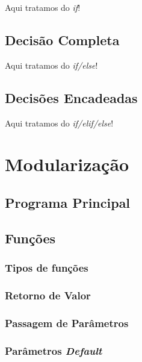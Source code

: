 \documentclass[
]{book}
\begin{document}
Aqui tratamos do \emph{if}!

\hypertarget{decis-if-else}{%
\section{Decisão Completa}\label{decis-if-else}}

Aqui tratamos do \emph{if/else}!

\hypertarget{decis-if-elif-else}{%
\section{Decisões Encadeadas}\label{decis-if-elif-else}}

Aqui tratamos do \emph{if/elif/else}!

\hypertarget{modul}{%
\chapter{Modularização}\label{modul}}

\hypertarget{modul-main}{%
\section{Programa Principal}\label{modul-main}}

\hypertarget{modul-funcao}{%
\section{Funções}\label{modul-funcao}}

\hypertarget{modul-funcao-tipos}{%
\subsection{Tipos de funções}\label{modul-funcao-tipos}}

\hypertarget{modul-funcao-return}{%
\subsection{Retorno de Valor}\label{modul-funcao-return}}

\hypertarget{modul-funcao-param}{%
\subsection{Passagem de Parâmetros}\label{modul-funcao-param}}

\hypertarget{modul-funcao-default}{%
\subsection{\texorpdfstring{Parâmetros \emph{Default}}{Parâmetros Default}}\label{modul-funcao-default}}
\end{document}

